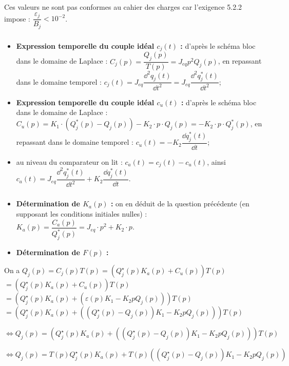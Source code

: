 \documentclass[10pt,fleqn]{article} %
\begin{document}
Ces valeurs ne sont pas conformes au cahier des charges car l'exigence 5.2.2 impose : $\dfrac{\varepsilon_j}{B_j}<10^{-2}$.



\subparagraph{}\textit{}%


\begin{itemize}
\item \textbf{Expression temporelle du couple idéal $c_j(t)$ : }
d'après le schéma bloc dans le domaine de Laplace : $C_j(p)=\dfrac{Q_j(p)}{T(p)}=J_{eq}p^2Q_j(p)$, en repassant dans le domaine temporel : 
$
c_j(t)=J_{eq}\dfrac{\dd ^2q_j(t)}{\dd t^2}=J_{eq}\dfrac{\dd ^2q^*_j(t)}{\dd t^2}
$;
\item \textbf{Expression temporelle du couple idéal $c_u(t)$ : }
d'après le schéma bloc dans le domaine de Laplace : $C_u(p)=K_1\cdot (Q^*_j(p)-Q_j(p))-K_2\cdot p\cdot Q_j(p)=-K_2\cdot p\cdot Q^*_j(p)$, en repassant dans le domaine temporel : 
$
c_u(t)=-K_{2}\dfrac{\dd q^*_j(t)}{\dd t}$;
\item au niveau du comparateur on lit : $c_a(t)=c_j(t)-c_u(t)$, ainsi $c_a(t)=J_{eq}\dfrac{\dd ^2q^*_j(t)}{\dd t^2}+K_{2}\dfrac{\dd q^*_j(t)}{\dd t}$.
\end{itemize}
\subparagraph{}\textit{}%


\begin{itemize}
\item \textbf{Détermination de $K_a(p)$ :} on en déduit de la question précédente (en supposant les conditions initiales nulles) : $K_a(p)=\dfrac{C_a(p)}{Q^*_j(p)}=J_{eq}\cdot p^2+K_2\cdot p$.
\item \textbf{Détermination de $F(p)$ :}
\end{itemize}

On a $Q_j(p) = C_j(p) T(p)= \left( Q_j^{\star}(p) K_a(p) + C_u(p) \right) T(p)$
$= \left( Q_j^{\star}(p) K_a(p) + C_u(p) \right) T(p)$
$= \left( Q_j^{\star}(p) K_a(p) + \left( \varepsilon(p) K_1 - K_2 p Q_j(p) \right)\right) T(p)$
$= \left( Q_j^{\star}(p) K_a(p) + \left( \left(Q_j^{\star}(p) - Q_j(p) \right) K_1 - K_2 p Q_j(p) \right)\right) T(p)$


$\Leftrightarrow Q_j(p) = 
\left(
    Q_j^{\star}(p) K_a(p) + 
    \left( 
        \left(Q_j^{\star}(p) - Q_j(p) \right) K_1 - K_2 p Q_j(p) 
    \right)
\right) T(p)$

$\Leftrightarrow Q_j(p) = 
    T(p)Q_j^{\star}(p) K_a(p) + 
    T(p)\left( 
        \left(Q_j^{\star}(p) - Q_j(p) \right) K_1 - K_2 p Q_j(p) 
    \right) $
\end{document}
